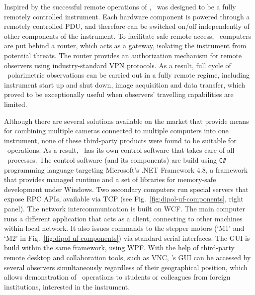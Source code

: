 Inspired by the successful remote operations of \DP, \DUF\ was designed to be a fully remotely controlled instrument.
Each hardware component is powered through a remotely controlled \gls{PDU}, and therefore can be switched on/off independently of other components of the instrument.
To facilitate safe remote access, \DUF\ computers are put behind a router, which acts as a gateway, isolating the instrument from potential threats.
The router provides an authorization mechanism for remote observers using industry-standard \gls{VPN} protocols.
As a result, full cycle of \DUF\ polarimetric observations can be carried out in a fully remote regime, including instrument start up and shut down, image acquisition and data transfer, which proved to be exceptionally useful when observers' travelling capabilities are limited.


Although there are several solutions available on the market that provide means for combining multiple cameras connected to multiple computers into one instrument, none of these third-party products were found to be suitable for \DUF\ operations.
As a result, \DUF\ has its own control software that takes care of all \DUF\ processes.
The control software (and its components) are build using \texttt{C\#} programming language targeting Microsoft's .NET Framework 4.8, a framework that provides managed runtime and a set of libraries for memory-safe development under Windows.
Two secondary computers run special servers that expose \gls{RPC} \glspl{API}, available via \gls{TCP} (see Fig.~\ref{fig:dipol-uf-components}, right panel).
The network intercommunication is built on \gls{WCF}.
The main computer runs a different application that acts as a client, connecting to other machines within local network.
It also issues commands to the stepper motors (`M1' and `M2' in Fig.~\ref{fig:dipol-uf-components}) via standard serial interfaces.
The \gls{GUI} is build within the same framework, using \gls{WPF}.
With the help of third-party remote desktop and collaboration tools, such as \gls{VNC}, \DUF's \gls{GUI} can be accessed by several observers simultaneously regardless of their geographical position, which allows demonstration of \DUF\ operations to students or colleagues from foreign institutions, interested in the instrument.

